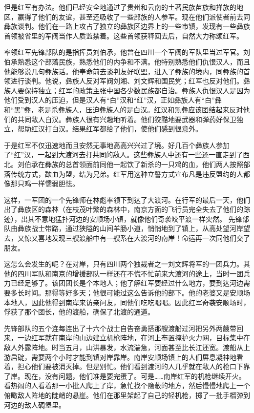 \documentclass[10pt]{book}
\begin{document}
但是红军有办法。他们已经安全地通过了贵州和云南的土著民族苗族和掸族的地区，赢得了他们的友谊，甚至还吸收了一些部族的人参军。现在他们派使者前去同彝族谈判。他们在一路上攻占了独立的彝族区边界上的一些市镇，发现有一些彝族首领被省里的军阀当作人质监禁着。这些首领获释回去后，自然大力称颂红军。

率领红军先锋部队的是指挥员刘伯承，他曾在四川一个军阀的军队里当过军官。刘伯承熟悉这个部落民族，熟悉他们的内争和不满。他特别熟悉他们仇恨汉人，而且他能够说几句彝族话。他奉命前去谈判友好联盟，进入了彝族的境内，同彝族的首领进行谈判。他说，彝族人反对军阀刘湘、刘文辉和国民党；红军也反对他们。彝族人要保持独立；红军的政策主张中国各少数民族都自治。彝族人仇恨汉人是因为他们受到汉人的压迫，但是汉人有“白”汉和“红”汉，正如彝族人有“白”彝和“黑”彝，老是杀彝族人，压迫彝族人的是白汉。红汉和黑彝应该团结起来反对他们的共同敌人白汉。彝族人很有兴趣地听着。他们狡黠地要武器和弹药好保卫独立，帮助红汉打白汉。结果红军都给了他们，使他们感到很意外。

于是红军不仅迅速地而且安然无事地高高兴兴过了境。好几百个彝族人参加了“红”汉，一起到大渡河去打共同的敌人。这些彝族人中还有一些还一直走到了西北。刘伯承在彝族的总首领面前同他一起饮了新杀的一只鸡的血，他们两人按照部落传统方式，歃血为盟，结为兄弟。红军用这种立誓方式宣布凡是违反盟约的人都像那只鸡一样懦弱胆怯。

这样，一军团的一个先锋师在林彪率领下到达了大渡河。在行军的最后一天，他们出了彝族区的森林（在枝茂叶繁的森林中，南京方面的飞行员完全失去了他们的踪迹），出其不意地猛扑河边的安顺场小镇，就像他们奇袭皎平渡一样突然。 先锋部队由彝族战士带路，通过狭隘的山间羊肠小道，悄悄地到了镇上，从高处望河岸望去，又惊又喜地发现三艘渡船中有一艘系在大渡河的南岸！命运再一次同他们交了朋友。

这怎么会发生的呢？在对岸，只有四川两个独裁者之一刘文辉将军的一团兵力。其他的四川军队和南京的增援部队一样还在不慌不忙前来大渡河的途上，当时一团兵力已经足够了。该团团长是个本地人；他了解红军要经过什么地方，要到达河边需要多长时间。那得等好多天；他很可能过这么告诉他的部下。他的老婆又是安顺场本地人，因此他得到南岸来访亲问友，同他们吃吃喝喝。因此红军奇袭安顺场时，俘获了那个团长，他的渡船，确保了北渡的通道。

先锋部队的五个连每连出了十六个战士自告奋勇搭那艘渡船过河把另外两艘带回来，一边红军就在南岸的山边建立机枪阵地，在河上布置掩护火力网，目标集中在敌人外露阵地。时当五月，山洪暴发，水流湍急，河面甚至比长江还宽。渡船从上游启碇，需要两个小时才能到镇对岸靠岸。南岸安顺场镇上的人们屏息凝神地看着，担心他们要被消灭掉。但是别忙。他们看到渡河的人几乎就在敌人的枪口下靠了岸。现在，没有问题，他们准是要完蛋了。可是……南岸红军的机枪继续开火。看热闹的人看着那一小批人爬上了岸，急忙找个隐蔽的地方，然后慢慢地爬上一个俯瞰敌人阵地的陡峭的悬崖。他们在那里架起了自己的轻机枪，掷了一批手榴弹到河边的敌人碉堡里。
\end{document}
